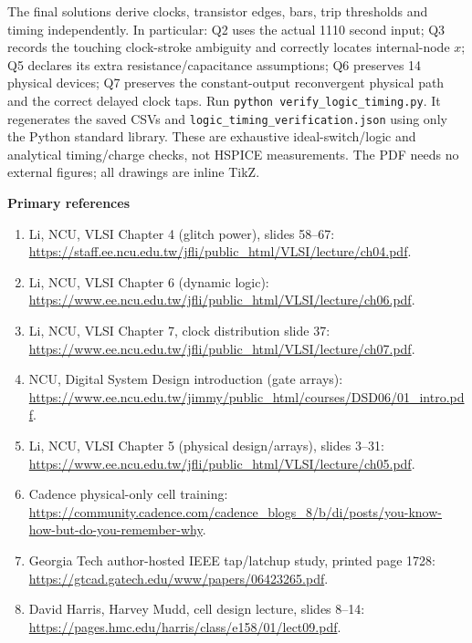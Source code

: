 \documentclass[10pt]{article}
\newcommand{\qheading}[1]{\par\medskip\textbf{#1}\par}
\begin{document}
The final solutions derive clocks, transistor edges, bars, trip thresholds and timing independently. In particular: Q2 uses the actual 1110 second input; Q3 records the touching clock-stroke ambiguity and correctly locates internal-node $x$; Q5 declares its extra resistance/capacitance assumptions; Q6 preserves 14 physical devices; Q7 preserves the constant-output reconvergent physical path and the correct delayed clock taps.
Run \texttt{python verify\_logic\_timing.py}. It regenerates the saved CSVs and \texttt{logic\_timing\_verification.json} using only the Python standard library. These are exhaustive ideal-switch/logic and analytical timing/charge checks, not HSPICE measurements. The PDF needs no external figures; all drawings are inline TikZ.
\qheading{Primary references}
{\raggedright
\begin{enumerate}[leftmargin=6mm,itemsep=3pt]
\item Li, NCU, VLSI Chapter 4 (glitch power), slides 58--67: \url{https://staff.ee.ncu.edu.tw/jfli/public_html/VLSI/lecture/ch04.pdf}.
\item Li, NCU, VLSI Chapter 6 (dynamic logic): \url{https://www.ee.ncu.edu.tw/jfli/public_html/VLSI/lecture/ch06.pdf}.
\item Li, NCU, VLSI Chapter 7, clock distribution slide 37: \url{https://www.ee.ncu.edu.tw/jfli/public_html/VLSI/lecture/ch07.pdf}.
\item NCU, Digital System Design introduction (gate arrays): \url{https://www.ee.ncu.edu.tw/jimmy/public_html/courses/DSD06/01_intro.pdf}.
\item Li, NCU, VLSI Chapter 5 (physical design/arrays), slides 3--31: \url{https://www.ee.ncu.edu.tw/jfli/public_html/VLSI/lecture/ch05.pdf}.
\item Cadence physical-only cell training: \url{https://community.cadence.com/cadence_blogs_8/b/di/posts/you-know-how-but-do-you-remember-why}.
\item Georgia Tech author-hosted IEEE tap/latchup study, printed page 1728: \url{https://gtcad.gatech.edu/www/papers/06423265.pdf}.
\item David Harris, Harvey Mudd, cell design lecture, slides 8--14: \url{https://pages.hmc.edu/harris/class/e158/01/lect09.pdf}.
\end{enumerate}
\par}
\end{document}
